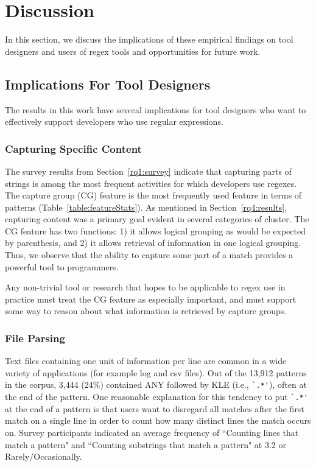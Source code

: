 \section{Discussion}
\label{sec:discussion}

In this section, we discuss the implications of these empirical findings on tool designers and users of regex tools and opportunities for future work.

\subsection{Implications For Tool Designers}
The results in this work have several implications for tool designers who want to effectively support developers who use regular expressions.

\subsubsection{Capturing Specific Content}
The survey results from Section~\ref{rq1:survey} indicate that capturing parts of strings is among the most frequent activities for which developers use regexes.
The capture group (CG) feature is the most frequently used feature in terms of patterns (Table~\ref{table:featureStats}).  As mentioned in Section~\ref{rq4:results}, capturing content was a primary goal evident in several categories of cluster.  The CG feature has two functions: 1) it allows logical grouping as would be expected by parenthesis, and 2) it allows retrieval of information in one logical grouping.  Thus, we observe that the ability to capture some part of a match provides a powerful tool to programmers.

Any non-trivial tool or research that hopes to be applicable to regex use in practice must treat the CG feature as especially important, and must support some way to reason about what information is retrieved by capture groups.

\subsubsection{File Parsing}
Text files containing one unit of information per line are common in a wide variety of applications (for example log and csv files).  Out of the 13,912 patterns in the corpus, 3,444 (24\%) contained ANY followed by KLE  (i.e., \verb!`.*'!), often at the end of the pattern.
One reasonable explanation for this tendency to put \verb!`.*'! at the end of a pattern is that users want to disregard all matches after the first match on a single line in order to count how many distinct lines the match occurs on.  Survey participants indicated an average frequency of ``Counting lines that match a pattern" and ``Counting substrings that match a pattern" at 3.2 or Rarely/Occasionally.

